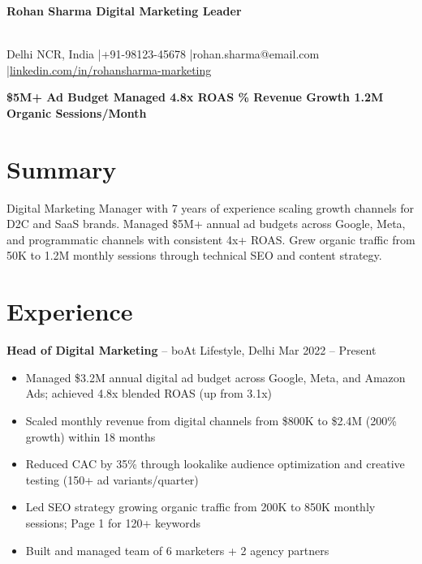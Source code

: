 \documentclass[10pt,a4paper]{article}
\begin{document}
\noindent\colorbox{accent}{\parbox{\textwidth}{\color{white}\bfseries\large\quad Rohan Sharma \hfill Digital Marketing Leader\quad}}\\[6pt]
{\small Delhi NCR, India \quad|\quad +91-98123-45678 \quad|\quad rohan.sharma@email.com \quad|\quad \href{https://linkedin.com/in/rohansharma-marketing}{linkedin.com/in/rohansharma-marketing}}

\vspace{4pt}

\begin{tcolorbox}[colback=lightorange,colframe=accent,boxrule=0.5pt,arc=2pt,left=4pt,right=4pt,top=3pt,bottom=3pt]
\centering\small\bfseries
\$5M+ Ad Budget Managed \quad\textbar\quad 4.8x ROAS \quad\textbar{}\% Revenue Growth \quad\textbar\quad 1.2M Organic Sessions/Month
\end{tcolorbox}

\section{Summary}
Digital Marketing Manager with 7 years of experience scaling growth channels for D2C and SaaS brands. Managed \$5M+ annual ad budgets across Google, Meta, and programmatic channels with consistent 4x+ ROAS. Grew organic traffic from 50K to 1.2M monthly sessions through technical SEO and content strategy.

\section{Experience}

\textbf{Head of Digital Marketing} -- boAt Lifestyle, Delhi \hfill Mar 2022 -- Present
\begin{itemize}
  \item Managed \$3.2M annual digital ad budget across Google, Meta, and Amazon Ads; achieved 4.8x blended ROAS (up from 3.1x)
  \item Scaled monthly revenue from digital channels from \$800K to \$2.4M (200\% growth) within 18 months
  \item Reduced CAC by 35\% through lookalike audience optimization and creative testing (150+ ad variants/quarter)
  \item Led SEO strategy growing organic traffic from 200K to 850K monthly sessions; Page 1 for 120+ keywords
  \item Built and managed team of 6 marketers + 2 agency partners
\end{itemize}
\end{document}
